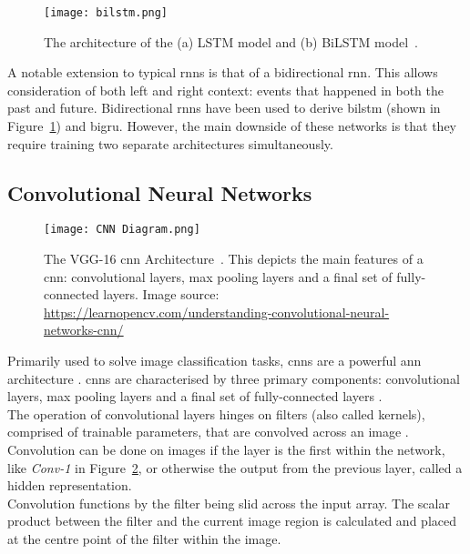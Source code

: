\begin{figure}
\centering
\texttt{[image: bilstm.png]}
\caption[The architecture of the (a) LSTM model and (b) BiLSTM model.]{The architecture of the (a) LSTM model and (b) BiLSTM model~\cite{bilstm_diagram}.}
\label{fig:bilstm diagram}
\end{figure}
A notable extension to typical \acrshort{rnn}s is that of a bidirectional \acrshort{rnn}. This allows consideration of both left and right context: events that happened in both the past and future. Bidirectional \acrshort{rnn}s have been used to derive \acrfull{bilstm} (shown in Figure~\ref{fig:bilstm diagram}) and \acrfull{bigru}. However, the main downside of these networks is that they require training two separate architectures simultaneously.
\subsection{Convolutional Neural Networks}
\begin{figure}
\centering
\texttt{[image: CNN Diagram.png]}
\caption[The VGG-16 \acrfull{cnn} Architecture.]{The VGG-16 \acrfull{cnn} Architecture~\cite{vgg_architecture}. This depicts the main features of a \acrshort{cnn}: convolutional layers, max pooling layers and a final set of fully-connected layers. Image source: \url{https://learnopencv.com/understanding-convolutional-neural-networks-cnn/}}
\label{fig:cnn diagram}
\end{figure}
Primarily used to solve image classification tasks, \acrfull{cnns} are a powerful \acrshort{ann} architecture \cite{cnn_intro, Convolutional-neural-network:-a-review-of...}. \acrshort{cnn}s are characterised by three primary components: convolutional layers, max pooling layers and a final set of fully-connected layers \cite{cnn_intro}.\\
The operation of convolutional layers hinges on filters (also called kernels), comprised of trainable parameters, that are convolved across an image \cite{Convolutional-neural-network-(CNN)-for-image-detection-and-recognition, Convolutional-neural-network:-a-review-of...}. Convolution can be done on images if the layer is the first within the network, like \emph{Conv-1} in Figure~\ref{fig:cnn diagram}, or otherwise the output from the previous layer, called a hidden representation.\\
Convolution functions by the filter being slid across the input array. The scalar product between the filter and the current image region is calculated and placed at the centre point of the filter within the image.\\
